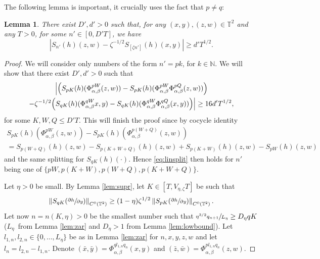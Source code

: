 \documentclass[10pt]{amsart}
\theoremstyle{definition}
\theoremstyle{plain}
\newtheorem{lemma}[definition]{Lemma}
\newcommand\NN{\mathbb{N}}
\newcommand\TT{\mathbb{T}}
\begin{document}
The following lemma is important, it crucially uses the fact that $p\neq q$:
\begin{lemma}\label{lem:linsplit} There exist $D',d'>0$
such that, for any $(x,y), (z,w)\in \TT^2$ and any $T>0$, for some $n'\in [0,D'T]$, we have
\begin{equation}\label{eq:linsplit}
|S_{n'}(h)(z,w)-\zeta^{-1/2}S_{[\zeta n']}(h)(x,y)|\geq d'T^{1/2}.
\end{equation}
\end{lemma}
\begin{proof} We will consider only numbers of the form $n'=pk$, for $k\in \NN$. We will show that there exist $D',d'>0$ such that
\begin{multline}\label{mu:show}
\Bigl| \Bigl(S_{pK}(h)(\Phi_{\alpha,\beta}^{pW}(z,w))-S_{pK}(h)(\Phi_{\alpha,\beta}^{pW}\Phi_{\alpha,\beta}^{pQ}(z,w)) \Bigr)\\
-\zeta^{-1/2}
\Bigl(S_{qK}(h)(\Phi_{\alpha,\beta}^{qW}x,y)-S_{qK}(h)(\Phi_{\alpha,\beta}^{qW}\Phi_{\alpha,\beta}^{qQ}(x,y)) \Bigr)
\Bigr|\geq 16d'T^{1/2},
\end{multline}
for some $K,W,Q\leq D' T$. This will finish the proof since by cocycle identity\vspace*{-5pt}
\begin{multline*}
S_{pK}(h)(\Phi_{\alpha,\beta}^{pW}(z,w))-S_{pK}(h)(\Phi_{\alpha,\beta}^{p(W+Q)}(z,w))\\
=S_{p(W+Q)}(h)(z,w)-S_{p(K+W+Q)}(h)(z,w)+S_{p(K+W)}(h)(z,w)-
S_{pW}(h)(z,w)
\end{multline*}
and the same splitting for $S_{qK}(h)(\cdot)$. Hence \eqref{eq:linsplit} then holds for $n'$ being one of $\{pW,p(K+W),p(W+Q),p(K+W+Q)\}$.

Let $\eta>0$ be small. By Lemma \ref{lem:supr}, let $K\in [T,V_{\eta,\zeta}T]$ be such that
\begin{equation}\label{eq2}
\left\|S_{qK}(\sfrac{\partial h}{\partial y})\right\|_{C^0(\TT^2)}\geq (1-\eta)\zeta^{1/2}\left\|S_{pK}(\sfrac{\partial h}{\partial y})\right\|_{C^0(\TT^2)}.
\end{equation}
Let now $n=n(K,\eta)>0$ be the smallest number such that
$\sfrac{\eta^{3/2}q_{n+1}}{L_\eta}\geq D_\eta qK$ ($L_\eta$~from Lemma \ref{lem:zar} and $D_\eta>1$ from Lemma \ref{lem:lowbound}). Let $l_{1,n},l_{2,n}\in \{0,\ldots,L_\eta\}$ be as in Lemma \ref{lem:zar} for $n,x,y,z,w$ and let $l_n=l_{2,n}-l_{1,n}$. Denote $(\bar{x},\bar{y})=\Phi_{\alpha,\beta}^{ql_{1,n}q_n}(x,y)$ and
$(\bar{z},\bar{w})=\Phi_{\alpha,\beta}^{pl_{1,n}q_n}(z,w)$.


\end{proof}
\end{document}

